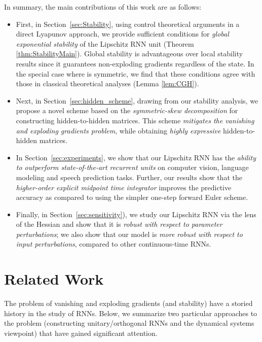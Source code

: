\documentclass{article} \usepackage{iclr2021_conference,times}
\begin{document}
In summary, the main contributions of this work are as follows:
\begin{itemize}\vspace{-0.15cm}
	\item First, in Section~\ref{sec:Stability}, using control theoretical arguments in a direct Lyapunov approach, we provide sufficient conditions for \emph{global exponential stability} of the Lipschitz RNN unit (Theorem \ref{thm:StabilityMain}). Global stability is advantageous over local stability results since it guarantees non-exploding gradients regardless of the state. In the special case where  is symmetric, we find that these conditions agree with those in classical theoretical analyses (Lemma \ref{lem:CGH}).


	\item Next, in Section~\ref{sec:hidden_scheme}, drawing from our stability analysis, we propose a novel scheme based on the \emph{symmetric-skew decomposition} for constructing hidden-to-hidden matrices. This scheme \emph{mitigates the vanishing and exploding gradients problem}, while obtaining \emph{highly expressive} hidden-to-hidden matrices.
	
	\item In Section~\ref{sec:experiments}, we show that our Lipschitz RNN has the \emph{ability to outperform state-of-the-art recurrent units} on computer vision, language modeling and speech prediction tasks.
Further, our results show that the \emph{higher-order explicit midpoint time integrator} improves the predictive accuracy as compared to using the simpler one-step forward Euler scheme.  

	\item 
	Finally, in Section~\ref{sec:sensitivity}), we study our Lipschitz RNN via the lens of the Hessian and show that it is \emph{robust with respect to parameter perturbations}; we also show that our model is \emph{more robust with respect to input perturbations}, compared to other continuous-time RNNs.
	
\end{itemize}



\section{Related Work}

The problem of vanishing and exploding gradients (and stability) have a storied history in the study of RNNs.
Below, we summarize two particular approaches to the problem (constructing unitary/orthogonal RNNs and the dynamical systems viewpoint) that have gained significant attention.
\end{document}
